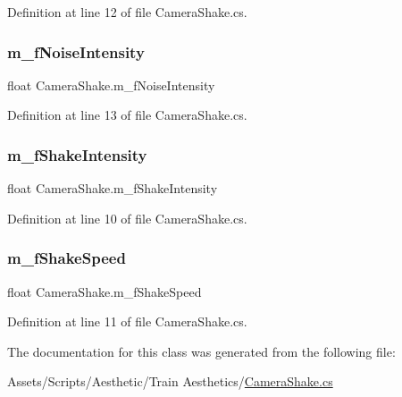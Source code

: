 Definition at line 12 of file Camera\+Shake.\+cs.

\mbox{\label{class_camera_shake_a2f459bdffabca04043f698bd4b3b124c}} 
\subsubsection{\texorpdfstring{m\+\_\+f\+Noise\+Intensity}{m\_fNoiseIntensity}}
{\footnotesize\ttfamily float Camera\+Shake.\+m\+\_\+f\+Noise\+Intensity}



Definition at line 13 of file Camera\+Shake.\+cs.

\mbox{\label{class_camera_shake_af3e9f7de3c037153193e0dd99309dd1c}} 
\subsubsection{\texorpdfstring{m\+\_\+f\+Shake\+Intensity}{m\_fShakeIntensity}}
{\footnotesize\ttfamily float Camera\+Shake.\+m\+\_\+f\+Shake\+Intensity}



Definition at line 10 of file Camera\+Shake.\+cs.

\mbox{\label{class_camera_shake_a8a71e58f4b23e0a644b05f1fe4ae6bc8}} 
\subsubsection{\texorpdfstring{m\+\_\+f\+Shake\+Speed}{m\_fShakeSpeed}}
{\footnotesize\ttfamily float Camera\+Shake.\+m\+\_\+f\+Shake\+Speed}



Definition at line 11 of file Camera\+Shake.\+cs.



The documentation for this class was generated from the following file\+:\begin{DoxyCompactItemize}
\item 
Assets/\+Scripts/\+Aesthetic/\+Train Aesthetics/\mbox{\hyperlink{_camera_shake_8cs}{Camera\+Shake.\+cs}}\end{DoxyCompactItemize}
